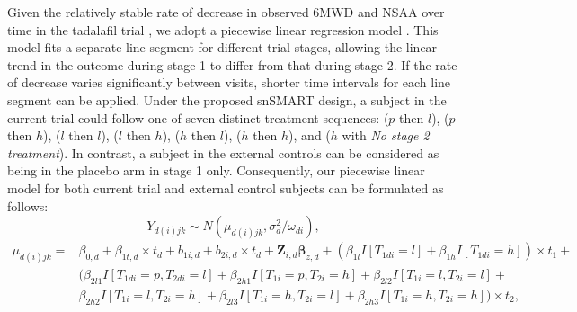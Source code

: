 Given the relatively stable rate of decrease in observed \ac{6MWD} and \ac{NSAA} over time in the tadalafil trial \citep{victor2017phase}, we adopt a piecewise linear regression model \citep{nahum2020smart}. This model fits a separate line segment for different trial stages, allowing the linear trend in the outcome during stage 1 to differ from that during stage 2. If the rate of decrease varies significantly between visits, shorter time intervals for each line segment can be applied. Under the proposed \ac{snSMART} design, a subject in the current trial could follow one of seven distinct treatment sequences: ($p$ then $l$), ($p$ then $h$), ($l$ then $l$), ($l$ then $h$), ($h$ then $l$), ($h$ then $h$), and ($h$ with \textit{No stage 2 treatment}). In contrast, a subject in the external controls can be considered as being in the placebo arm in stage 1 only. Consequently, our piecewise linear model for both current trial and external control subjects can be formulated as follows:
$$Y_{d(i)jk} \sim N(\mu_{d(i)jk}, \sigma_{d}^2/\omega_{di}),$$
\begin{equation}
\begin{split}
    \mu_{d(i)jk} = & \beta_{0,d} + \beta_{1t,d} \times t_d + b_{1i,d} + b_{2i,d} \times t_d + \boldsymbol{Z}_{i,d}\boldsymbol{\beta}_{z,d} + (\beta_{1l} I[T_{1di}=l] + \beta_{1h} I[T_{1di}=h]) \times t_1  + \\
    & (\beta_{2l1} I[T_{1di}=p, T_{2di}=l] + \beta_{2h1} I[T_{1i}=p, T_{2i}=h] + \beta_{2l2} I[T_{1i}=l, T_{2i}=l] + \\
    & \beta_{2h2} I[T_{1i}=l, T_{2i}=h] + \beta_{2l3}I[T_{1i} = h, T_{2i} = l] + \beta_{2h3} I[T_{1i}=h, T_{2i}=h])\times t_2,
\end{split}
\label{eqn:bwlp}
\end{equation}
